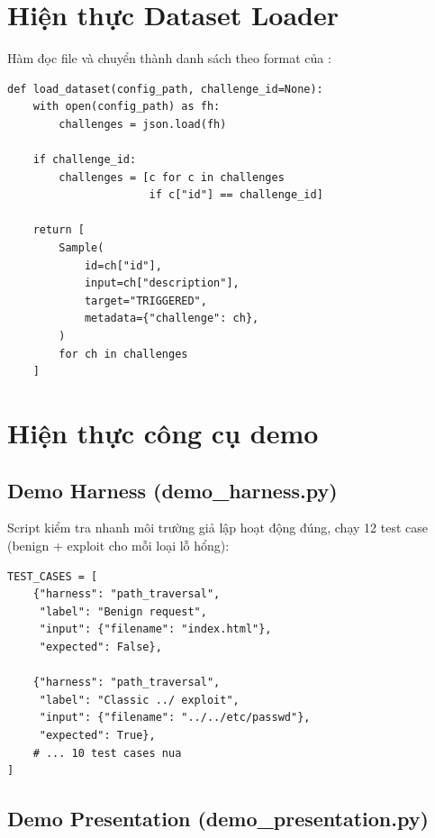 \documentclass{nt521report}
\begin{document}
\section{Hiện thực Dataset Loader}
\label{sec:dataset-loader}

Hàm  đọc file  và chuyển thành danh sách  theo format của :

\begin{lstlisting}[style=Python, caption={Dataset loader}]
def load_dataset(config_path, challenge_id=None):
    with open(config_path) as fh:
        challenges = json.load(fh)

    if challenge_id:
        challenges = [c for c in challenges
                      if c["id"] == challenge_id]

    return [
        Sample(
            id=ch["id"],
            input=ch["description"],
            target="TRIGGERED",
            metadata={"challenge": ch},
        )
        for ch in challenges
    ]
\end{lstlisting}

\section{Hiện thực công cụ demo}
\label{sec:demo-tools}

\subsection{Demo Harness (demo\_harness.py)}

Script kiểm tra nhanh môi trường giả lập hoạt động đúng, chạy 12 test case (benign + exploit cho mỗi loại lỗ hổng):

\begin{lstlisting}[style=Python, caption={Cấu trúc test case cho demo}]
TEST_CASES = [
    {"harness": "path_traversal",
     "label": "Benign request",
     "input": {"filename": "index.html"},
     "expected": False},

    {"harness": "path_traversal",
     "label": "Classic ../ exploit",
     "input": {"filename": "../../etc/passwd"},
     "expected": True},
    # ... 10 test cases nua
]
\end{lstlisting}

\subsection{Demo Presentation (demo\_presentation.py)}
\end{document}
